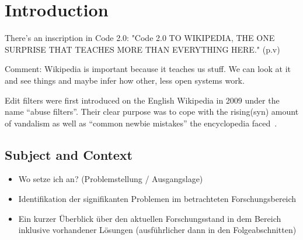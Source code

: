 %
\chapter{Introduction}
\label{chap:introduction}

There's an inscription in Code 2.0:
"Code 2.0
TO WIKIPEDIA, THE ONE SURPRISE THAT TEACHES MORE THAN EVERYTHING HERE." (p.v)~\cite{Lessig2006}

Comment: Wikipedia is important because it teaches us stuff. We can look at it and see things and maybe infer how other, less open systems work.

\begin{comment}
Don't make it a separate subsection, but use it to introduce the topic with a story, the way Geiger does.
If the genesis doesn't make sense here, move it to Edit filters
\end{comment}


Edit filters were first introduced on the English Wikipedia in 2009 under the name ``abuse filters''.
Their clear purpose was to cope with the rising(syn) amount of vandalism as well as ``common newbie mistakes'' the encyclopedia faced~\cite{Signpost2009}.


\section{Subject and Context}
\begin{itemize}
	\item Wo setze ich an? (Problemstellung / Ausgangslage)
	\item Identifikation der signifikanten Problemen im betrachteten Forschungsbereich
	\item Ein kurzer Überblick über den aktuellen Forschungsstand in dem Bereich inklusive vorhandener Lösungen (ausführlicher dann in den Folgeabschnitten)
\end{itemize}


